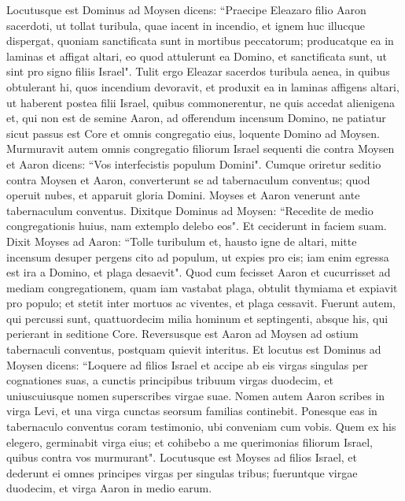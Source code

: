 \begin{biblechapter}  
\verse Locutusque est Dominus ad Moysen dicens: 
\verse “Praecipe Eleazaro filio Aaron sacerdoti, ut tollat turibula, quae iacent in incendio, et ignem huc illucque dispergat, quoniam sanctificata sunt 
\verse in mortibus peccatorum; producatque ea in laminas et affigat altari, eo quod attulerunt ea Domino, et sanctificata sunt, ut sint pro signo filiis Israel". 
\verse Tulit ergo Eleazar sacerdos turibula aenea, in quibus obtulerant hi, quos incendium devoravit, et produxit ea in laminas affigens altari, 
\verse ut haberent postea filii Israel, quibus commonerentur, ne quis accedat alienigena et, qui non est de semine Aaron, ad offerendum incensum Domino, ne patiatur sicut passus est Core et omnis congregatio eius, loquente Domino ad Moysen. 
\verse Murmuravit autem omnis congregatio filiorum Israel sequenti die contra Moysen et Aaron dicens: “Vos interfecistis populum Domini". 
\verse Cumque oriretur seditio contra Moysen et Aaron, converterunt se ad tabernaculum conventus; quod operuit nubes, et apparuit gloria Domini. 
\verse Moyses et Aaron venerunt ante tabernaculum conventus. 
\verse Dixitque Dominus ad Moysen: 
\verse “Recedite de medio congregationis huius, nam extemplo delebo eos". Et ceciderunt in faciem suam. 
\verse Dixit Moyses ad Aaron: “Tolle turibulum et, hausto igne de altari, mitte incensum desuper pergens cito ad populum, ut expies pro eis; iam enim egressa est ira a Domino, et plaga desaevit". 
\verse Quod cum fecisset Aaron et cucurrisset ad mediam congregationem, quam iam vastabat plaga, obtulit thymiama et expiavit pro populo; 
\verse et stetit inter mortuos ac viventes, et plaga cessavit. 
\verse Fuerunt autem, qui percussi sunt, quattuordecim milia hominum et septingenti, absque his, qui perierant in seditione Core. 
\verse Reversusque est Aaron ad Moysen ad ostium tabernaculi conventus, postquam quievit interitus. 
\verse Et locutus est Dominus ad Moysen dicens: 
\verse “Loquere ad filios Israel et accipe ab eis virgas singulas per cognationes suas, a cunctis principibus tribuum virgas duodecim, et uniuscuiusque nomen superscribes virgae suae. 
\verse Nomen autem Aaron scribes in virga Levi, et una virga cunctas seorsum familias continebit. 
\verse Ponesque eas in tabernaculo conventus coram testimonio, ubi conveniam cum vobis. 
\verse Quem ex his elegero, germinabit virga eius; et cohibebo a me querimonias filiorum Israel, quibus contra vos murmurant". 
\verse Locutusque est Moyses ad filios Israel, et dederunt ei omnes principes virgas per singulas tribus; fueruntque virgae duodecim, et virga Aaron in medio earum. 

\end{biblechapter}
